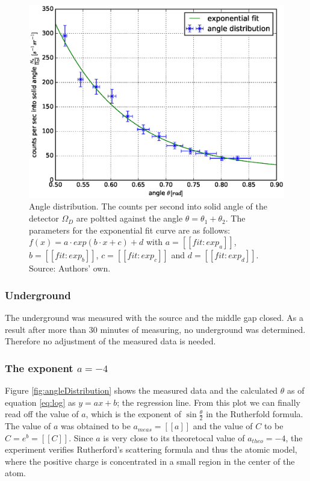 \documentclass[a4paper]{article}
\begin{document}
\begin{figure}[H]
\centering
\includegraphics[width=1.0\textwidth]{plots/angle_distribution2.eps}
\caption{Angle distribution. The counts per second into solid angle of the detector $\Omega_D$ are poltted against the angle $\theta = \theta_1 + \theta_2$. The parameters for the exponential fit curve are as follows: $f(x) = a \cdot exp(b \cdot x + c) + d$ with $a = [[fit:exp_a]]$, $b = [[fit:exp_b]]$, $c = [[fit:exp_c]]$ and $d = [[fit:exp_d]]$. Source: Authors' own.}
\label{fig:angleDistribution2}
\end{figure}

\subsubsection{Underground}

The underground was measured with the source and the middle gap closed. As a result after more than $30$ minutes of measuring, no underground was determined. Therefore no adjustment of the measured data is needed.

\subsubsection{The exponent $a = -4$}

Figure \ref{fig:angleDistribution} shows the measured data and the calculated $\theta$ as of equation \eqref{eq:log} as $y = a x + b$; the regression line. From this plot we can finally read off the value of $a$, which is the exponent of $\sin{\frac{\theta}{2}}$ in the Rutherfold formula. The value of $a$ was obtained to be $a_{meas} = [[a]]$ and the value of $C$ to be $C = e^b = [[C]]$.
\newline
Since $a$ is very close to its theoretocal value of $a_{theo} = -4$, the experiment verifies Rutherford's scattering formula and thus the atomic model, where the positive charge is concentrated in a small region in the center of the atom.
\end{document}
